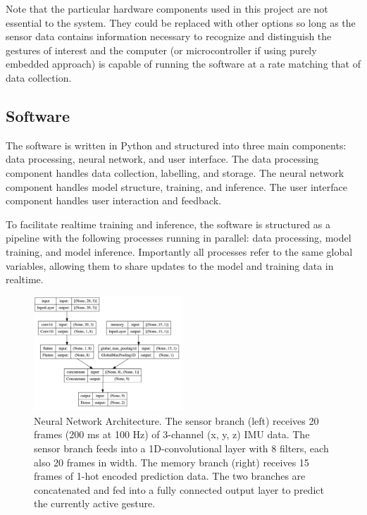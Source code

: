\documentclass{nime-alternate} %
\begin{document}
Note that the particular hardware components used in this project are not essential to the system. They could be replaced with other options so long as the sensor data contains information necessary to recognize and distinguish the gestures of interest and the computer (or microcontroller if using purely embedded approach) is capable of running the software at a rate matching that of data collection.

\subsection{Software}
The software is written in Python and structured into three main components: data processing, neural network, and user interface. The data processing component handles data collection, labelling, and storage. The neural network component handles model structure, training, and inference. The user interface component handles user interaction and feedback.

To facilitate realtime training and inference, the software is structured as a pipeline with the following processes running in parallel: data processing, model training, and model inference. Importantly all processes refer to the same global variables, allowing them to share updates to the model and training data in realtime.


\begin{figure}[h]
    \includegraphics[width=0.5\textwidth]{../figures/model_diagram.jpg}
    \caption{Neural Network Architecture. The sensor branch (left) receives 20 frames (200 ms at 100 Hz) of 3-channel (x, y, z) IMU data. The sensor branch feeds into a 1D-convolutional layer with 8 filters, each also 20 frames in width. The memory branch (right) receives 15 frames of 1-hot encoded prediction data. The two branches are concatenated and fed into a fully connected output layer to predict the currently active gesture.}
    \label{fig:neural_network}
\end{figure}
\end{document}
